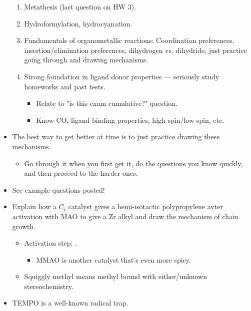 \documentclass[../notes.tex]{subfiles}
\begin{document}
\begin{itemize}
\begin{enumerate}
        \item Metathesis (last question on HW 3).
        \item Hydroformylation, hydrocyanation.
        \item Fundamentals of organometallic reactions: Coordination preferences, insertion/elimination preferences, dihydrogen vs. dihydride, just practice going through and drawing mechanisms.
        \item Strong foundation in ligand donor properties --- seriously study homeworks and past tests.
        \begin{itemize}
            \item Relate to "is this exam cumulative?" question.
            \item Know CO, ligand binding properties, high spin/low spin, etc.
        \end{itemize}
    \end{enumerate}
    \item The best way to get better at time is to just practice drawing these mechanisms.
    \begin{itemize}
        \item Go through it when you first get it, do the questions you know quickly, and then proceed to the harder ones.
    \end{itemize}
    \item See example questions posted!
    \item Explain how a $C_i$ catalyst gives a hemi-isotactic polypropylene avter activation with MAO to give a Zr alkyl and draw the mechanism of chain growth.
    \begin{itemize}
        \item Activation step: .
        \begin{itemize}
            \item MMAO is another catalyst that's even more spicy.
        \end{itemize}
        \item Squiggly methyl means methyl bound with either/unknown stereochemistry.
    \end{itemize}
    \item TEMPO is a well-known radical trap.
\end{itemize}
\end{document}
